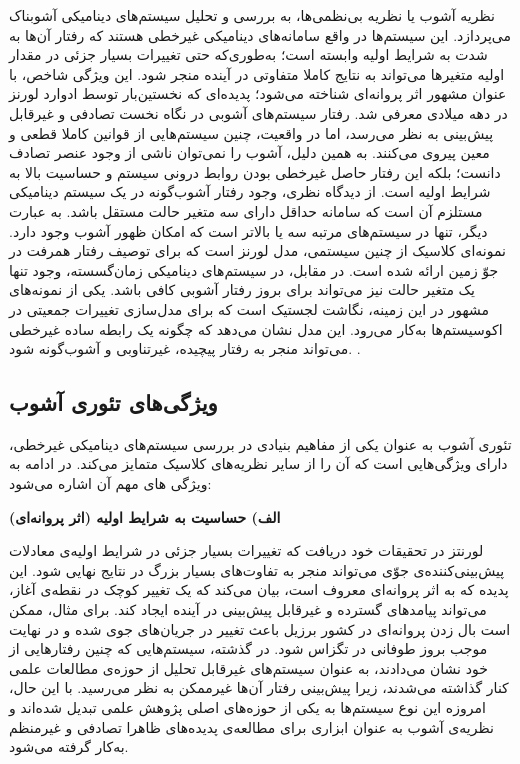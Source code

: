 نظریه آشوب یا نظریه بی‌نظمی‌ها، به بررسی و تحلیل سیستم‌های دینامیکی آشوبناک می‌پردازد. این سیستم‌ها در واقع سامانه‌های دینامیکی غیرخطی هستند که رفتار آن‌ها به شدت به شرایط اولیه وابسته است؛ به‌طوری‌که حتی تغییرات بسیار جزئی در مقدار اولیه متغیرها می‌تواند به نتایج کاملا متفاوتی در آینده منجر شود. این ویژگی شاخص، با عنوان مشهور اثر پروانه‌ای شناخته می‌شود؛ پدیده‌ای که نخستین‌بار توسط ادوارد لورنز در دهه  میلادی معرفی شد. رفتار سیستم‌های آشوبی در نگاه نخست تصادفی و غیرقابل پیش‌بینی به نظر می‌رسد، اما در واقعیت، چنین سیستم‌هایی از قوانین کاملا قطعی و معین پیروی می‌کنند. به همین دلیل، آشوب را نمی‌توان ناشی از وجود عنصر تصادف دانست؛ بلکه این رفتار حاصل غیرخطی بودن روابط درونی سیستم و حساسیت بالا به شرایط اولیه است. از دیدگاه نظری، وجود رفتار آشوب‌گونه در یک سیستم دینامیکی مستلزم آن است که سامانه حداقل دارای سه متغیر حالت مستقل باشد. به عبارت دیگر، تنها در سیستم‌های مرتبه سه یا بالاتر است که امکان ظهور آشوب وجود دارد. نمونه‌ای کلاسیک از چنین سیستمی، مدل لورنز است که برای توصیف رفتار همرفت در جوّ زمین ارائه شده است. در مقابل، در سیستم‌های دینامیکی زمان‌گسسته، وجود تنها یک متغیر حالت نیز می‌تواند برای بروز رفتار آشوبی کافی باشد. یکی از نمونه‌های مشهور در این زمینه، نگاشت لجستیک است که برای مدل‌سازی تغییرات جمعیتی در اکوسیستم‌ها به‌کار می‌رود. این مدل نشان می‌دهد که چگونه یک رابطه ساده غیرخطی می‌تواند منجر به رفتار پیچیده، غیرتناوبی و آشوب‌گونه شود. \cite{ref42, ref46}.

\subsection{ویژگی‌های تئوری آشوب}

تئوری آشوب به عنوان یکی از مفاهیم بنیادی در بررسی سیستم‌های دینامیکی غیرخطی، دارای ویژگی‌هایی است که آن را از سایر نظریه‌های کلاسیک متمایز می‌کند. در ادامه به ویژگی های مهم آن اشاره می‌شود:

\textbf{الف) حساسیت به شرایط اولیه (اثر پروانه‌ای)}

لورنتز در تحقیقات خود دریافت که تغییرات بسیار جزئی در شرایط اولیه‌ی معادلات پیش‌بینی‌کننده‌ی جوّی می‌تواند منجر به تفاوت‌های بسیار بزرگ در نتایج نهایی شود. این پدیده که به اثر پروانه‌ای معروف است، بیان می‌کند که یک تغییر کوچک در نقطه‌ی آغاز، می‌تواند پیامدهای گسترده و غیرقابل پیش‌بینی در آینده ایجاد کند. برای مثال، ممکن است بال زدن پروانه‌ای در کشور برزیل باعث تغییر در جریان‌های جوی شده و در نهایت موجب بروز طوفانی در تگزاس شود. در گذشته، سیستم‌هایی که چنین رفتارهایی از خود نشان می‌دادند، به عنوان سیستم‌های غیرقابل تحلیل از حوزه‌ی مطالعات علمی کنار گذاشته می‌شدند، زیرا پیش‌بینی رفتار آن‌ها غیرممکن به نظر می‌رسید. با این حال، امروزه این نوع سیستم‌ها به یکی از حوزه‌های اصلی پژوهش علمی تبدیل شده‌اند و نظریه‌ی آشوب به عنوان ابزاری برای مطالعه‌ی پدیده‌های ظاهرا تصادفی و غیرمنظم به‌کار گرفته می‌شود\cite{ref41}.

